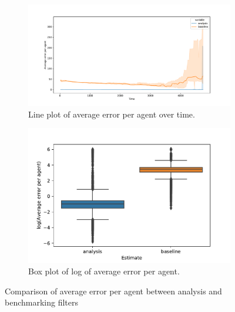 \documentclass{article}
\begin{document}
\begin{figure}[htbp]
	\centering
	\begin{subfigure}[htb]{0.54\textwidth}
		\centering
		\includegraphics[width=\textwidth]{figures/exp2/truncated_median_analysis_baseline_line.pdf}
		\caption{Line plot of average error per agent over time.}\label{fig:analysis_baseline_line}
	\end{subfigure}
	\begin{subfigure}[htb]{0.45\textwidth}
		\centering
		\includegraphics[width=\textwidth]{figures/exp2/truncated_median_analysis_baseline_log_box.pdf}
		\caption{Box plot of log of average error per
			agent.}\label{fig:analysis_baseline_log_box}
	\end{subfigure}
	\caption{Comparison of average error per agent between analysis and
		benchmarking filters}\label{fig:median_analysis_baseline}
\end{figure}
\end{document}
